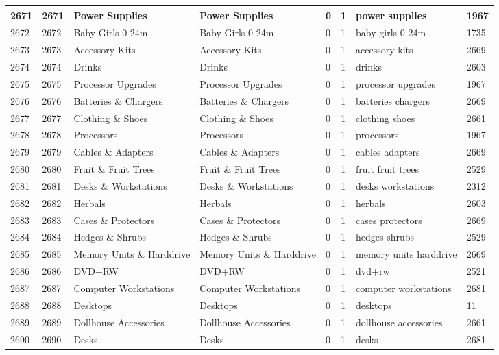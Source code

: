 \begin{longtable}{|l|l|l|l|l|l|l|l|}
2671 & 2671 & Power Supplies & Power Supplies & 0 & 1 & power supplies & 1967 \\ \hline 
2672 & 2672 & Baby Girls 0-24m & Baby Girls 0-24m & 0 & 1 & baby girls 0-24m & 1735 \\ \hline 
2673 & 2673 & Accessory Kits & Accessory Kits & 0 & 1 & accessory kits & 2669 \\ \hline 
2674 & 2674 & Drinks & Drinks & 0 & 1 & drinks & 2603 \\ \hline 
2675 & 2675 & Processor Upgrades & Processor Upgrades & 0 & 1 & processor upgrades & 1967 \\ \hline 
2676 & 2676 & Batteries \& Chargers & Batteries \& Chargers & 0 & 1 & batteries chargers & 2669 \\ \hline 
2677 & 2677 & Clothing \& Shoes & Clothing \& Shoes & 0 & 1 & clothing shoes & 2661 \\ \hline 
2678 & 2678 & Processors & Processors & 0 & 1 & processors & 1967 \\ \hline 
2679 & 2679 & Cables \& Adapters & Cables \& Adapters & 0 & 1 & cables adapters & 2669 \\ \hline 
2680 & 2680 & Fruit \& Fruit Trees & Fruit \& Fruit Trees & 0 & 1 & fruit fruit trees & 2529 \\ \hline 
2681 & 2681 & Desks \& Workstations & Desks \& Workstations & 0 & 1 & desks workstations & 2312 \\ \hline 
2682 & 2682 & Herbals & Herbals & 0 & 1 & herbals & 2603 \\ \hline 
2683 & 2683 & Cases \& Protectors & Cases \& Protectors & 0 & 1 & cases protectors & 2669 \\ \hline 
2684 & 2684 & Hedges \& Shrubs & Hedges \& Shrubs & 0 & 1 & hedges shrubs & 2529 \\ \hline 
2685 & 2685 & Memory Units \& Harddrive & Memory Units \& Harddrive & 0 & 1 & memory units harddrive & 2669 \\ \hline 
2686 & 2686 & DVD+RW & DVD+RW & 0 & 1 & dvd+rw & 2521 \\ \hline 
2687 & 2687 & Computer Workstations & Computer Workstations & 0 & 1 & computer workstations & 2681 \\ \hline 
2688 & 2688 & Desktops & Desktops & 0 & 1 & desktops & 11 \\ \hline 
2689 & 2689 & Dollhouse Accessories & Dollhouse Accessories & 0 & 1 & dollhouse accessories & 2661 \\ \hline 
2690 & 2690 & Desks & Desks & 0 & 1 & desks & 2681 \\ \hline 

\end{longtable}
